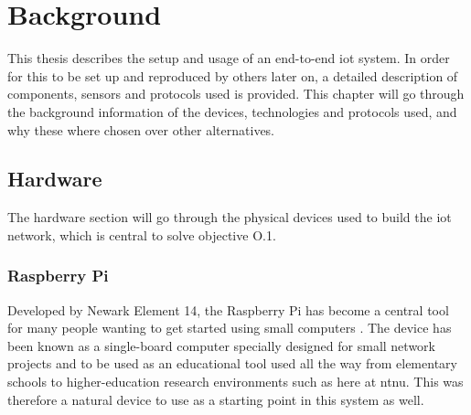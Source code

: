 \chapter{Background}
\label{chp:background} 

\noindent This thesis describes the setup and usage of an end-to-end \gls{iot} system. In order for this to be set up and reproduced by others later on, a detailed description of components, sensors and protocols used is provided. This chapter will go through the background information of the devices, technologies and protocols used, and why these where chosen over other alternatives. 






\section{Hardware}

\noindent The hardware section will go through the physical devices used to build the \gls{iot} network, which is central to solve objective O.1. 

\subsection{Raspberry Pi}

\noindent Developed by Newark Element 14, the Raspberry Pi has become a central tool for many people wanting to get started using small computers \cite{newark}. The device has been known as a single-board computer specially designed for small network projects and to be used as an educational tool used all the way from elementary schools to higher-education research environments such as here at \gls{ntnu}. This was therefore a natural device to use as a starting point in this system as well. 

